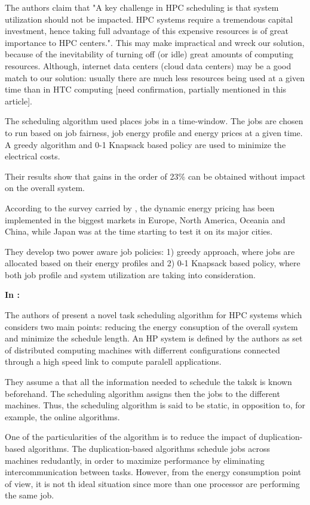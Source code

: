 The authors claim that "A key challenge in HPC scheduling is that system 
utilization should not be impacted. HPC systems require a tremendous capital 
investment, hence taking full advantage of this expensive resources is of great 
importance to HPC centers.". This may make impractical and wreck our solution,
because of the inevitability of turning off (or idle) great amounts of computing 
resources. Although, internet data centers (cloud data centers)  may be a good 
match to our solution: usually there are much less resources being used at a given 
time than in HTC computing [need confirmation, partially mentioned in this article].

The scheduling algorithm used places jobs in a time-window. The jobs are chosen
to run based on job fairness, job energy profile and energy prices at a given
time. A greedy algorithm and 0-1 Knapsack based policy are used to minimize the
electrical costs.

Their results show that gains in the order of 23\% can be obtained without
impact on the overall system. 

According to the survey carried by \cite{DYN_PRICING_HPC}, the dynamic energy
pricing has been implemented in the biggest markets in Europe, North America,
Oceania and China, while Japan was at the time starting to test it on its major
cities.

They develop two power aware job policies: 1) greedy approach, where jobs are
allocated based on their energy profiles  and 2) 0-1 Knapsack based policy,
where both job profile and system utilization are taking into consideration.



\textbf{In \cite{SCHED_HETEROGE}:}

The authors of \cite{SCHED_HETEROGE} present a novel task scheduling algorithm
for HPC systems which considers two main points: reducing the energy consuption
of the overall system and minimize the schedule length. An HP system is defined
by the authors as set of distributed computing machines with differrent
configurations connected through a high speed link to compute paralell
applications.

They assume a that all the information needed to schedule the taksk is known
beforehand. The scheduling algorithm assigns then the jobs to the different
machines. Thus, the scheduling algorithm is said to be static, in opposition to,
for example, the online algorithms. 

One of the particularities of the algorithm is to reduce the impact of
duplication-based algorithms. The duplication-based algorithms schedule jobs
across machines redudantly, in order to maximize performance by eliminating
intercommunication between tasks. However, from the energy consumption point of
view, it is not th ideal situation since more than one processor are performing
the same job.

